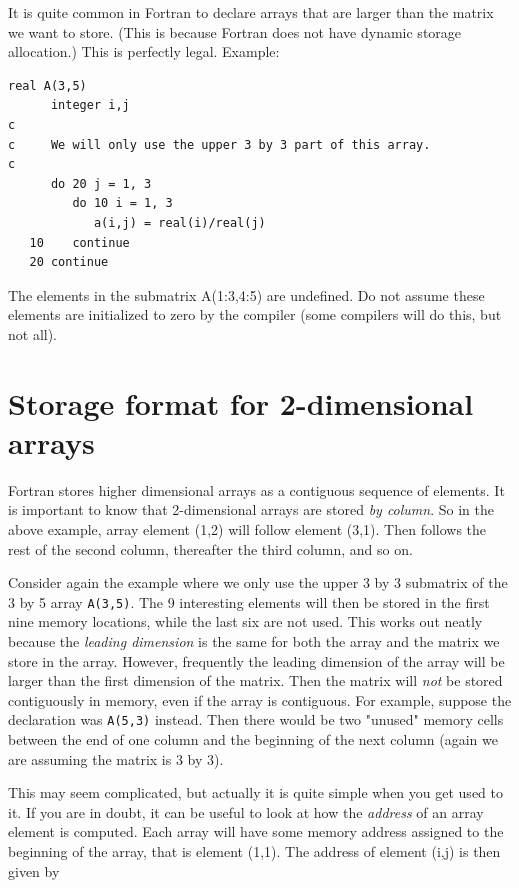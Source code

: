 It is quite common in Fortran to declare arrays that are larger than the matrix we want to store. (This is because Fortran does not have dynamic storage allocation.) This is perfectly legal. Example:

\begin{lstlisting}[style=fortran77]
      real A(3,5)
      integer i,j
c
c     We will only use the upper 3 by 3 part of this array.
c
      do 20 j = 1, 3
         do 10 i = 1, 3
            a(i,j) = real(i)/real(j)
   10    continue
   20 continue
\end{lstlisting}

The elements in the submatrix A(1:3,4:5) are undefined. Do not assume these elements are initialized to zero by the compiler (some compilers will do this, but not all).

\section{Storage format for 2-dimensional arrays}

Fortran stores higher dimensional arrays as a contiguous sequence of elements. It is important to know that 2-dimensional arrays are stored \emph{by column}. So in the above example, array element (1,2) will follow element (3,1). Then follows the rest of the second column, thereafter the third column, and so on.

Consider again the example where we only use the upper 3 by 3 submatrix of the 3 by 5 array \texttt{A(3,5)}. The 9 interesting elements will then be stored in the first nine memory locations, while the last six are not used. This works out neatly because the \emph{leading dimension} is the same for both the array and the matrix we store in the array. However, frequently the leading dimension of the array will be larger than the first dimension of the matrix. Then the matrix will \emph{not} be stored contiguously in memory, even if the array is contiguous. For example, suppose the declaration was \texttt{A(5,3)} instead. Then there would be two "unused" memory cells between the end of one column and the beginning of the next column (again we are assuming the matrix is 3 by 3).

This may seem complicated, but actually it is quite simple when you get used to it. If you are in doubt, it can be useful to look at how the \emph{address} of an array element is computed. Each array will have some memory address assigned to the beginning of the array, that is element (1,1). The address of element (i,j) is then given by

